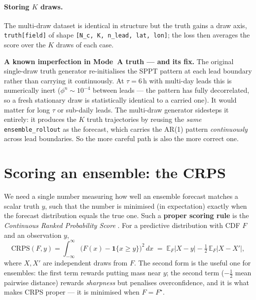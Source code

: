 \documentclass[11pt]{article}
\newcommand{\E}{\mathbb{E}}
\newcommand{\code}[1]{\texttt{#1}}
\begin{document}
\paragraph{Storing $K$ draws.} The multi-draw dataset is identical in structure
but the truth gains a draw axis, \code{truth[field]} of shape
\code{[N\_c, K, n\_lead, lat, lon]}; the loss then averages the score over the
$K$ draws of each case.

\begin{keybox}
\textbf{A known imperfection in Mode~A truth --- and its fix.} The original
single-draw truth generator re-initialises the SPPT pattern at each lead boundary
rather than carrying it continuously. At $\tau=6$\,h with multi-day leads this is
numerically inert ($\phi^{n}\!\sim\!10^{-4}$ between leads --- the pattern has
fully decorrelated, so a fresh stationary draw is statistically identical to a
carried one). It would matter for long $\tau$ or sub-daily leads. The multi-draw
generator sidesteps it entirely: it produces the $K$ truth trajectories by reusing
the \emph{same} \code{ensemble\_rollout} as the forecast, which carries the AR(1)
pattern \emph{continuously} across lead boundaries. So the more careful path is
also the more correct one.
\end{keybox}

\section{Scoring an ensemble: the CRPS}\label{sec:crps}

We need a single number measuring how well an ensemble forecast matches a scalar
truth $y$, such that the number is minimised (in expectation) exactly when the
forecast distribution equals the true one. Such a \textbf{proper scoring rule} is
the \emph{Continuous Ranked Probability Score} \citep{gneiting2007}. For a
predictive distribution with CDF $F$ and an observation $y$,
\begin{equation}
  \mathrm{CRPS}(F,y) = \int_{-\infty}^{\infty}\!\bigl(F(x) - \mathbf 1\{x\ge y\}\bigr)^2\,dx
  \;=\;
  \E_F|X-y| - \tfrac12\,\E_F|X-X'|,
  \label{eq:crps}
\end{equation}
where $X,X'$ are independent draws from $F$. The second form is the useful one for
ensembles: the first term rewards putting mass near $y$; the second term
($-\tfrac12$ mean pairwise distance) rewards \emph{sharpness} but penalises
overconfidence, and it is what makes CRPS proper --- it is minimised when $F=F^\star$.
\end{document}
